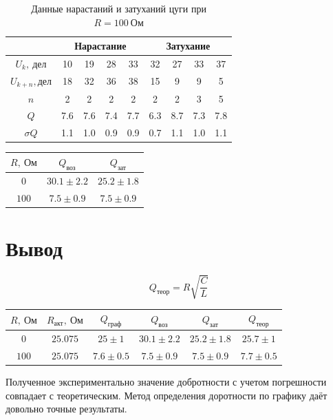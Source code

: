 \documentclass[a4paper, fontsize=14pt]{article}
\begin{document}
	\begin{table}[H]
	\centering
	\begin{tabular}{|c|c|c|c|c|c|c|c|c|}  \hline
	{} & \multicolumn{4}{|c|}{Нарастание} & \multicolumn{4}{|c|}{Затухание} \\\hline
	$U_k,\ \text{дел}$ & 10 & 19 & 28 & 33 & 32 & 27 & 33 & 37 \\\hline
	$U_{k+n}, \text{дел}$ & 18 & 32 & 36 & 38 & 15 & 9 & 9 & 5 \\\hline
	$n$ & 2 & 2 & 2 & 2 & 2 & 2 & 3 & 5 \\\hline
	$Q$ & 7.6 & 7.6 & 7.4 & 7.7 & 6.3 & 8.7 & 7.3 & 7.8 \\\hline
	$\sigma Q$ & 1.1 & 1.0 & 0.9 & 0.9 & 0.7 & 1.1 & 1.0 & 1.1 \\\hline
	\end{tabular}
	\caption{Данные нарастаний и затуханий цуги при $R = 100\ \text{Ом}$}
	\end{table}

	\begin{table}[H]
	\centering
	\begin{tabular}{|c|c|c|} \hline
	$R,\ \text{Ом}$ & $Q_\text{воз}$ & $Q_\text{зат}$ \\\hline
	$0$ & $30.1 \pm 2.2$ & $25.2 \pm 1.8$ \\\hline
	$100$ & $7.5 \pm 0.9$ & $7.5 \pm 0.9$ \\\hline 
	\end{tabular}	
	\end{table}
	\section*{Вывод}
	\[
		Q_\text{теор} = R \sqrt{\frac{C}{L}}
	\]
	\begin{table}[H]
	\centering
	\begin{tabular}{|c|c|c|c|c|c|} \hline
	$R,\ \text{Ом}$ & $R_\text{акт},\ \text{Ом}$ & $Q_\text{граф}$ & $Q_\text{воз}$ & $Q_\text{зат}$ & $Q_\text{теор}$ \\\hline
	$0$ & $25.075$ & $25 \pm 1$ & $30.1 \pm 2.2$ & $25.2 \pm 1.8$ & $25.7 \pm 1$ \\\hline
	$100$ & $25.075$ & $7.6 \pm 0.5$ & $7.5 \pm 0.9$ & $7.5 \pm 0.9$ & $7.7 \pm 0.5$ \\\hline 
	\end{tabular}	
	\end{table}
	Полученное экспериментально значение добротности с учетом погрешности совпадает с теоретическим. Метод определения доротности по графику даёт довольно точные результаты.
\end{document}
